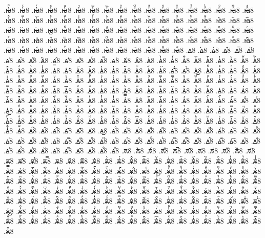 {.ꙗ҆ⷬ8
.ꙗ҆ⷭ8
.ꙗ҆ⷮ8
.ꙗ҆ⷯ8
.ꙗ҆ⷰ8
.ꙗ҆ⷱ8
.ꙗ҆ⷲ8
.ꙗ҆ⷳ8
.ꙗ҆ⷴ8
.ꙗ҆ⷵ8
.ꙗ҆ⷶ8
.ꙗ҆ⷷ8
.ꙗ҆ⷸ8
.ꙗ҆ⷹ8
.ꙗ҆ⷺ8
.ꙗ҆ⷻ8
.ꙗ҆ⷼ8
.ꙗ҆ⷽ8
.ꙗ҆ⷾ8
.ꙗ҆ⷿ8
.ꙗ҆꙯8
.ꙗ҆ꙴ8
.ꙗ҆ꙵ8
.ꙗ҆ꙶ8
.ꙗ҆ꙷ8
.ꙗ҆ꙸ8
.ꙗ҆ꙹ8
.ꙗ҆ꙺ8
.ꙗ҆ꙻ8
.ꙗ҆꙼8
.ꙗ҆꙽8
.ꙗ҆ꚞ8
.ꙗ҆ꚟ8
.ꙗ҇8
.ꙗ᷀8
.ꙗ᷁8
.ꙗ᷶8
.ꙗ᷷8
.ꙗ᷸8
.ꙗ᷹8
.ꙗⷠ8
.ꙗⷡ8
.ꙗⷢ8
.ꙗⷣ8
.ꙗⷤ8
.ꙗⷥ8
.ꙗⷦ8
.ꙗⷧ8
.ꙗⷨ8
.ꙗⷩ8
.ꙗⷪ8
.ꙗⷫ8
.ꙗⷬ8
.ꙗⷭ8
.ꙗⷮ8
.ꙗⷯ8
.ꙗⷰ8
.ꙗⷱ8
.ꙗⷲ8
.ꙗⷳ8
.ꙗⷴ8
.ꙗⷵ8
.ꙗⷶ8
.ꙗⷷ8
.ꙗⷸ8
.ꙗⷹ8
.ꙗⷺ8
.ꙗⷻ8
.ꙗⷼ8
.ꙗⷽ8
.ꙗⷾ8
.ꙗⷿ8
.ꙗ꙯8
.ꙗꙴ8
.ꙗꙵ8
.ꙗꙶ8
.ꙗꙷ8
.ꙗꙸ8
.ꙗꙹ8
.ꙗꙺ8
.ꙗꙻ8
.ꙗ꙼8
.ꙗ꙽8
.ꙗꚞ8
.ꙗꚟ8
.ꙙ8
.ꙙ̀8
.ꙙ́8
.ꙙ̂8
.ꙙ̅8
.ꙙ̆8
.ꙙ̇8
.ꙙ̈8
.ꙙ̋8
.ꙙ̏8
.ꙙ̑8
.ꙙ̓8
.ꙙ̔8
.ꙙ̾8
.ꙙ̿8
.ꙙ͘8
.ꙙ҃8
.ꙙ҄8
.ꙙ҅8
.ꙙ҅̀8
.ꙙ҅́8
.ꙙ҅̂8
.ꙙ҅̅8
.ꙙ҅̆8
.ꙙ҅̇8
.ꙙ҅̈8
.ꙙ҅̋8
.ꙙ҅̏8
.ꙙ҅̑8
.ꙙ҅̓8
.ꙙ҅̔8
.ꙙ҅̾8
.ꙙ҅̿8
.ꙙ҅͘8
.ꙙ҅҃8
.ꙙ҅҄8
.ꙙ҅҅8
.ꙙ҅҆8
.ꙙ҅҇8
.ꙙ҅᷀8
.ꙙ҅᷁8
.ꙙ҅᷶8
.ꙙ᷷҅8
.ꙙ᷸҅8
.ꙙ᷹҅8
.ꙙ҅ⷠ8
.ꙙ҅ⷡ8
.ꙙ҅ⷢ8
.ꙙ҅ⷣ8
.ꙙ҅ⷤ8
.ꙙ҅ⷥ8
.ꙙ҅ⷦ8
.ꙙ҅ⷧ8
.ꙙ҅ⷨ8
.ꙙ҅ⷩ8
.ꙙ҅ⷪ8
.ꙙ҅ⷫ8
.ꙙ҅ⷬ8
.ꙙ҅ⷭ8
.ꙙ҅ⷮ8
.ꙙ҅ⷯ8
.ꙙ҅ⷰ8
.ꙙ҅ⷱ8
.ꙙ҅ⷲ8
.ꙙ҅ⷳ8
.ꙙ҅ⷴ8
.ꙙ҅ⷵ8
.ꙙ҅ⷶ8
.ꙙ҅ⷷ8
.ꙙ҅ⷸ8
.ꙙ҅ⷹ8
.ꙙ҅ⷺ8
.ꙙ҅ⷻ8
.ꙙ҅ⷼ8
.ꙙ҅ⷽ8
.ꙙ҅ⷾ8
.ꙙ҅ⷿ8
.ꙙ҅꙯8
.ꙙ҅ꙴ8
.ꙙ҅ꙵ8
.ꙙ҅ꙶ8
.ꙙ҅ꙷ8
.ꙙ҅ꙸ8
.ꙙ҅ꙹ8
.ꙙ҅ꙺ8
.ꙙ҅ꙻ8
.ꙙ҅꙼8
.ꙙ҅꙽8
.ꙙ҅ꚞ8
.ꙙ҅ꚟ8
.ꙙ҆8
.ꙙ҆̀8
.ꙙ҆́8
.ꙙ҆̂8
.ꙙ҆̅8
.ꙙ҆̆8
.ꙙ҆̇8
.ꙙ҆̈8
.ꙙ҆̋8
.ꙙ҆̏8
.ꙙ҆̑8
.ꙙ҆̓8
.ꙙ҆̔8
.ꙙ҆̾8
.ꙙ҆̿8
.ꙙ҆͘8
.ꙙ҆҃8
.ꙙ҆҄8
.ꙙ҆҅8
.ꙙ҆҆8
.ꙙ҆҇8
.ꙙ҆᷀8
.ꙙ҆᷁8
.ꙙ҆᷶8
.ꙙ᷷҆8
.ꙙ᷸҆8
.ꙙ᷹҆8
.ꙙ҆ⷠ8
.ꙙ҆ⷡ8
.ꙙ҆ⷢ8
.ꙙ҆ⷣ8
.ꙙ҆ⷤ8
.ꙙ҆ⷥ8
.ꙙ҆ⷦ8
.ꙙ҆ⷧ8
.ꙙ҆ⷨ8
.ꙙ҆ⷩ8
.ꙙ҆ⷪ8
.ꙙ҆ⷫ8
.ꙙ҆ⷬ8
.ꙙ҆ⷭ8
.ꙙ҆ⷮ8
.ꙙ҆ⷯ8
.ꙙ҆ⷰ8
.ꙙ҆ⷱ8
.ꙙ҆ⷲ8
.ꙙ҆ⷳ8
.ꙙ҆ⷴ8
.ꙙ҆ⷵ8
.ꙙ҆ⷶ8
.ꙙ҆ⷷ8
.ꙙ҆ⷸ8
.ꙙ҆ⷹ8
.ꙙ҆ⷺ8
.ꙙ҆ⷻ8
.ꙙ҆ⷼ8
.ꙙ҆ⷽ8
.ꙙ҆ⷾ8
.ꙙ҆ⷿ8
.ꙙ҆꙯8
.ꙙ҆ꙴ8
.ꙙ҆ꙵ8
.ꙙ҆ꙶ8
.ꙙ҆ꙷ8
.ꙙ҆ꙸ8
.ꙙ҆ꙹ8
.ꙙ҆ꙺ8
.ꙙ҆ꙻ8
.ꙙ҆꙼8
.ꙙ҆꙽8
.ꙙ҆ꚞ8
.ꙙ҆ꚟ8
.ꙙ҇8
.ꙙ᷀8
.ꙙ᷁8
.ꙙ᷶8
.ꙙ᷷8
.ꙙ᷸8
.ꙙ᷹8
.ꙙⷠ8
.ꙙⷡ8
.ꙙⷢ8
.ꙙⷣ8
.ꙙⷤ8
.ꙙⷥ8
.ꙙⷦ8
.ꙙⷧ8
.ꙙⷨ8
.ꙙⷩ8
.ꙙⷪ8
.ꙙⷫ8
.ꙙⷬ8
.ꙙⷭ8
.ꙙⷮ8
.ꙙⷯ8
.ꙙⷰ8
.ꙙⷱ8
.ꙙⷲ8
.ꙙⷳ8
.ꙙⷴ8
.ꙙⷵ8
.ꙙⷶ8
.ꙙⷷ8
.ꙙⷸ8
.ꙙⷹ8
.ꙙⷺ8
.ꙙⷻ8
.ꙙⷼ8
.ꙙⷽ8
.ꙙⷾ8
.ꙙⷿ8
.ꙙ꙯8
.ꙙꙴ8
.ꙙꙵ8
.ꙙꙶ8
.ꙙꙷ8
.ꙙꙸ8
.ꙙꙹ8
.ꙙꙺ8
.ꙙꙻ8
.ꙙ꙼8
.ꙙ꙽8
.ꙙꚞ8
.ꙙꚟ8
.ꙛ8
.ꙛ̀8
.ꙛ́8
.ꙛ̂8
.ꙛ̅8
.ꙛ̆8
.ꙛ̇8
.ꙛ̈8
.ꙛ̋8
.ꙛ̏8
.ꙛ̑8
.ꙛ̓8
.ꙛ̔8
.ꙛ̾8
.ꙛ̿8
.ꙛ͘8
.ꙛ҃8
.ꙛ҄8
.ꙛ҅8
.ꙛ҅̀8
.ꙛ҅́8
.ꙛ҅̂8
.ꙛ҅̅8
.ꙛ҅̆8
.ꙛ҅̇8
.ꙛ҅̈8
.ꙛ҅̋8
.ꙛ҅̏8
.ꙛ҅̑8
.ꙛ҅̓8
.ꙛ҅̔8
.ꙛ҅̾8
.ꙛ҅̿8
.ꙛ҅͘8
.ꙛ҅҃8
.ꙛ҅҄8
.ꙛ҅҅8
.ꙛ҅҆8
.ꙛ҅҇8
.ꙛ҅᷀8
.ꙛ҅᷁8
.ꙛ҅᷶8
.ꙛ᷷҅8
.ꙛ᷸҅8
.ꙛ᷹҅8
.ꙛ҅ⷠ8
.ꙛ҅ⷡ8
.ꙛ҅ⷢ8
.ꙛ҅ⷣ8
.ꙛ҅ⷤ8
.ꙛ҅ⷥ8
.ꙛ҅ⷦ8
.ꙛ҅ⷧ8
.ꙛ҅ⷨ8
.ꙛ҅ⷩ8
.ꙛ҅ⷪ8
.ꙛ҅ⷫ8
.ꙛ҅ⷬ8
.ꙛ҅ⷭ8
.ꙛ҅ⷮ8
.ꙛ҅ⷯ8
.ꙛ҅ⷰ8
.ꙛ҅ⷱ8
.ꙛ҅ⷲ8
.ꙛ҅ⷳ8
.ꙛ҅ⷴ8
.ꙛ҅ⷵ8
.ꙛ҅ⷶ8
.ꙛ҅ⷷ8
.ꙛ҅ⷸ8
.ꙛ҅ⷹ8
.ꙛ҅ⷺ8
.ꙛ҅ⷻ8
.ꙛ҅ⷼ8
.ꙛ҅ⷽ8
.ꙛ҅ⷾ8
.ꙛ҅ⷿ8
.ꙛ҅꙯8
.ꙛ҅ꙴ8
.ꙛ҅ꙵ8
.ꙛ҅ꙶ8
.ꙛ҅ꙷ8
.ꙛ҅ꙸ8
.ꙛ҅ꙹ8
.ꙛ҅ꙺ8
.ꙛ҅ꙻ8
.ꙛ҅꙼8
.ꙛ҅꙽8
.ꙛ҅ꚞ8
.ꙛ҅ꚟ8
.ꙛ҆8
.ꙛ҆̀8
.ꙛ҆́8
.ꙛ҆̂8
.ꙛ҆̅8
.ꙛ҆̆8
.ꙛ҆̇8
.ꙛ҆̈8
.ꙛ҆̋8
.ꙛ҆̏8
.ꙛ҆̑8
.ꙛ҆̓8
.ꙛ҆̔8
.ꙛ҆̾8
.ꙛ҆̿8
.ꙛ҆͘8
.ꙛ҆҃8
.ꙛ҆҄8
.ꙛ҆҅8
.ꙛ҆҆8
.ꙛ҆҇8
.ꙛ҆᷀8
.ꙛ҆᷁8
.ꙛ҆᷶8
.ꙛ᷷҆8
.ꙛ᷸҆8
.ꙛ᷹҆8
.ꙛ҆ⷠ8
.ꙛ҆ⷡ8
.ꙛ҆ⷢ8
.ꙛ҆ⷣ8
.ꙛ҆ⷤ8
.ꙛ҆ⷥ8
.ꙛ҆ⷦ8
.ꙛ҆ⷧ8
.ꙛ҆ⷨ8
.ꙛ҆ⷩ8
.ꙛ҆ⷪ8
.ꙛ҆ⷫ8
.ꙛ҆ⷬ8
.ꙛ҆ⷭ8
.ꙛ҆ⷮ8
.ꙛ҆ⷯ8
.ꙛ҆ⷰ8
.ꙛ҆ⷱ8
.ꙛ҆ⷲ8
.ꙛ҆ⷳ8
.ꙛ҆ⷴ8
.ꙛ҆ⷵ8
.ꙛ҆ⷶ8
.ꙛ҆ⷷ8
.ꙛ҆ⷸ8
.ꙛ҆ⷹ8
.ꙛ҆ⷺ8
.ꙛ҆ⷻ8
.ꙛ҆ⷼ8
.ꙛ҆ⷽ8
.ꙛ҆ⷾ8
.ꙛ҆ⷿ8
.ꙛ҆꙯8
.ꙛ҆ꙴ8
.ꙛ҆ꙵ8
.ꙛ҆ꙶ8
.ꙛ҆ꙷ8
.ꙛ҆ꙸ8
.ꙛ҆ꙹ8
.ꙛ҆ꙺ8
.ꙛ҆ꙻ8
.ꙛ҆꙼8
}
